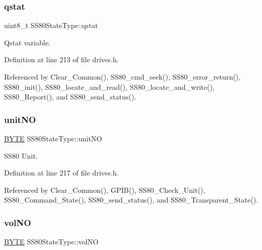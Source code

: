 \subsubsection{\texorpdfstring{qstat}{qstat}}
{\footnotesize\ttfamily uint8\+\_\+t S\+S80\+State\+Type\+::qstat}



Qstat variable. 



Definition at line 213 of file drives.\+h.



Referenced by Clear\+\_\+\+Common(), S\+S80\+\_\+cmd\+\_\+seek(), S\+S80\+\_\+error\+\_\+return(), S\+S80\+\_\+init(), S\+S80\+\_\+locate\+\_\+and\+\_\+read(), S\+S80\+\_\+locate\+\_\+and\+\_\+write(), S\+S80\+\_\+\+Report(), and S\+S80\+\_\+send\+\_\+status().

\mbox{\label{structSS80StateType_ad2b3cd5353f5650df931520a39b385e7}} 
\subsubsection{\texorpdfstring{unit\+NO}{unitNO}}
{\footnotesize\ttfamily \hyperlink{ff_8h_a4ae1dab0fb4b072a66584546209e7d58}{B\+Y\+TE} S\+S80\+State\+Type\+::unit\+NO}



S\+S80 Unit. 



Definition at line 217 of file drives.\+h.



Referenced by Clear\+\_\+\+Common(), G\+P\+I\+B(), S\+S80\+\_\+\+Check\+\_\+\+Unit(), S\+S80\+\_\+\+Command\+\_\+\+State(), S\+S80\+\_\+send\+\_\+status(), and S\+S80\+\_\+\+Transparent\+\_\+\+State().

\mbox{\label{structSS80StateType_ac197866db7677ec4bf9ad5e29e4a58a3}} 
\subsubsection{\texorpdfstring{vol\+NO}{volNO}}
{\footnotesize\ttfamily \hyperlink{ff_8h_a4ae1dab0fb4b072a66584546209e7d58}{B\+Y\+TE} S\+S80\+State\+Type\+::vol\+NO}



